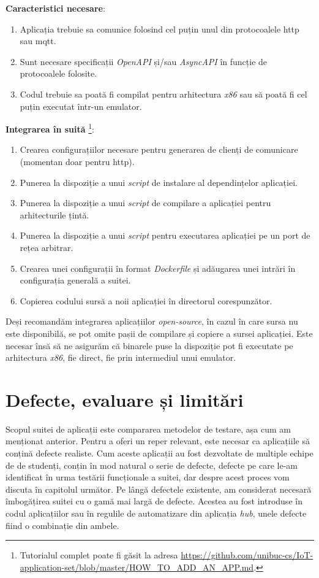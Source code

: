 \textbf{Caracteristici necesare}:
\begin{enumerate}
    \item Aplicația trebuie sa comunice folosind cel puțin unul din protocoalele \acrshort{http} sau \acrshort{mqtt}.
    \item Sunt necesare specificații \textit{OpenAPI} și/sau \textit{AsyncAPI} în funcție de protocoalele folosite.
    \item Codul trebuie sa poată fi compilat pentru arhitectura \textit{x86} sau să poată fi cel puțin executat într-un emulator.
\end{enumerate}

\textbf{Integrarea în suită} \footnote{Tutorialul complet poate fi găsit la adresa \url{https://github.com/unibuc-cs/IoT-application-set/blob/master/HOW_TO_ADD_AN_APP.md}.}:
\begin{enumerate}
    \item Crearea configurațiilor necesare pentru generarea de clienți de comunicare (momentan doar pentru \acrshort{http}).
    \item Punerea la dispoziție a unui \textit{script} de instalare al dependințelor aplicației.
    \item Punerea la dispoziție a unui \textit{script} de compilare a aplicației pentru arhitecturile țintă.
    \item Punerea la dispoziție a unui \textit{script} pentru executarea aplicației pe un port de rețea arbitrar.
    \item Crearea unei configurații în format \textit{Dockerfile} și adăugarea unei intrări în configurația generală a suitei.
    \item Copierea codului sursă a noii aplicației în directorul corespunzător.
\end{enumerate}

Deși recomandăm integrarea aplicațiilor \textit{open-source}, în cazul în care sursa nu este disponibilă, se pot omite pașii de compilare și copiere a sursei aplicației. Este necesar însă să ne asigurăm că binarele puse la dispoziție pot fi executate pe arhitectura \textit{x86}, fie direct, fie prin intermediul unui emulator.

\section{Defecte, evaluare și limitări}

Scopul suitei de aplicații este compararea metodelor de testare, așa cum am menționat anterior. Pentru a oferi un reper relevant, este necesar ca aplicațiile să conțină defecte realiste. Cum aceste aplicații au fost dezvoltate de multiple echipe de de studenți, conțin în mod natural o serie de defecte, defecte pe care le-am identificat în urma testării funcționale a suitei, dar despre acest proces vom discuta în capitolul următor. Pe lângă defectele existente, am considerat necesară îmbogățirea suitei cu o gamă mai largă de defecte. Acestea au fost introduse în codul aplicațiilor sau în regulile de automatizare din aplicația \textit{hub}, unele defecte fiind o combinație din ambele.

